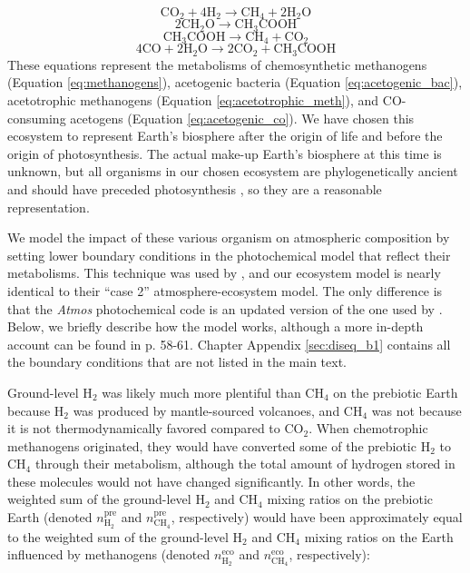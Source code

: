 \begin{equation}
  \label{eq:methanogens}
  \mathrm{CO_2} + 4 \mathrm{H_2} \rightarrow \mathrm{CH_4} + 2 \mathrm{H_2O}
\end{equation}
\begin{equation}
  \label{eq:acetogenic_bac}
  2 \mathrm{CH_2O} \rightarrow \mathrm{CH_3COOH}
\end{equation}
\begin{equation}
  \label{eq:acetotrophic_meth}
  \mathrm{CH_3COOH} \rightarrow \mathrm{CH_4} + \mathrm{CO_2}
\end{equation}
\begin{equation}
  \label{eq:acetogenic_co}
  4 \mathrm{CO} + 2 \mathrm{H_2O} \rightarrow 2 \mathrm{CO_2} + \mathrm{CH_3COOH}
\end{equation}
These equations represent the metabolisms of chemosynthetic methanogens (Equation \eqref{eq:methanogens}), acetogenic bacteria (Equation \eqref{eq:acetogenic_bac}), acetotrophic methanogens (Equation \eqref{eq:acetotrophic_meth}), and CO-consuming acetogens (Equation \eqref{eq:acetogenic_co}). We have chosen this ecosystem to represent Earth's biosphere after the origin of life and before the origin of photosynthesis. The actual make-up Earth's biosphere at this time is unknown, but all organisms in our chosen ecosystem are phylogenetically ancient and should have preceded photosynthesis \citep{Adam_2018,Schonheit_2016,Wolfe_2018}, so they are a reasonable representation. 

We model the impact of these various organism on atmospheric composition by setting lower boundary conditions in the photochemical model that reflect their metabolisms. This technique was used by \citet{Kharecha_2005}, and our ecosystem model is nearly identical to their ``case 2'' atmosphere-ecosystem model. The only difference is that the \textit{Atmos} photochemical code is an updated version of the one used by \citet{Kharecha_2005}. Below, we briefly describe how the model works, although a more in-depth account can be found in \citet{Kharecha_2005} p. 58-61. Chapter Appendix \ref{sec:diseq_b1} contains all the boundary conditions that are not listed in the main text.

Ground-level H$_2$ was likely much more plentiful than CH$_4$ on the prebiotic Earth because H$_2$ was produced by mantle-sourced volcanoes, and CH$_4$ was not because it is not thermodynamically favored compared to CO$_2$. When chemotrophic methanogens originated, they would have converted some of the prebiotic H$_2$ to CH$_4$ through their metabolism, although the total amount of hydrogen stored in these molecules would not have changed significantly. In other words, the weighted sum of the ground-level H$_2$ and CH$_4$ mixing ratios on the prebiotic Earth (denoted $n_\mathrm{H_2}^\mathrm{pre}$ and $n_\mathrm{CH_4}^\mathrm{pre}$, respectively) would have been approximately equal to the weighted sum of the ground-level H$_2$ and CH$_4$ mixing ratios on the Earth influenced by methanogens (denoted $n_\mathrm{H_2}^\mathrm{eco}$ and $n_\mathrm{CH_4}^\mathrm{eco}$, respectively):

